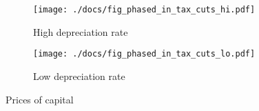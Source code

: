 \documentclass[12pt]{pracjourn_rwr}
\theoremstyle{definition}
\theoremstyle{remark}
\begin{document}


\begin{figure}
\centering
\begin{subfigure}{\textwidth}
\centering
\texttt{[image: ./docs/fig\_phased\_in\_tax\_cuts\_hi.pdf]}
\caption{High depreciation rate}
\label{fig:price-hi}
\end{subfigure}
\begin{subfigure}{\textwidth}
\centering
\texttt{[image: ./docs/fig\_phased\_in\_tax\_cuts\_lo.pdf]}
\caption{Low depreciation rate}
\label{fig:price-low}
\end{subfigure}
\caption{Prices of capital}
\label{fig:prices}
\end{figure}

% 
% 
\end{document}
